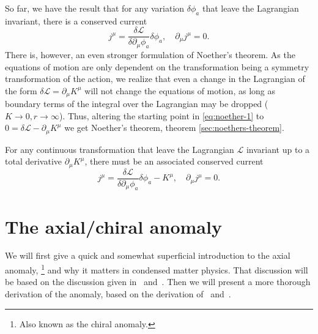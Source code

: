 So far, we have the result that for any variation $\delta \phi_a$ that leave the Lagrangian invariant, there is a conserved current
\begin{equation}
  j^{\mu} = \frac{\delta \mathcal{L}}{\delta \partial_{\mu}\phi_a} \delta\phi_a, \quad \partial_{\mu}j^{\mu} = 0.
\end{equation}
There is, however, an even stronger formulation of Noether's theorem.
As the equations of motion are only dependent on the transformation being a symmetry transformation of the action, we realize that even a change in the Lagrangian of the form $\delta \mathcal{L} = \partial_{\mu}K^{\mu}$ will not change the equations of motion, as long as boundary terms of the integral over the Lagrangian may be dropped ($K\to  0, r \to \infty$).
Thus, altering the starting point in \cref{eq:noether-1} to $0 = \delta \mathcal{L} - \partial_{\mu}K^{\mu}$ we get Noether's theorem, theorem \ref{sec:noethers-theorem}.
\begin{theorem}\label{sec:noethers-theorem}
  For any continuous transformation that leave the Lagrangian $\mathcal{L}$ invariant up to a total derivative $\partial _{\mu }K^{\mu }$, there must be an associated conserved current
  \begin{equation}
    \label{eq:noether_thm}
    j^{\mu} = \frac{\delta \mathcal{L}}{\delta \partial_{\mu} \phi_a} \delta \phi_a - K^{\mu}, \quad \partial_{\mu }j^{\mu } =0.
  \end{equation}
\end{theorem}


\section{The axial/chiral anomaly}
We will first give a quick and somewhat superficial introduction to the axial anomaly,%
\footnote{Also known as the chiral anomaly.}
and why it matters in condensed matter physics.
That discussion will be based on the discussion given in~\textcite{wehlingDiracMaterials2014} and~\textcite[Ch.~3]{tongGaugeTheoryLecture}.
Then we will present a more thorough derivation of the anomaly, based on the derivation of~\textcite{zeeQuantumFieldTheory2010} and~\textcite{kachelriessQuantumFieldsHubble2018}.

